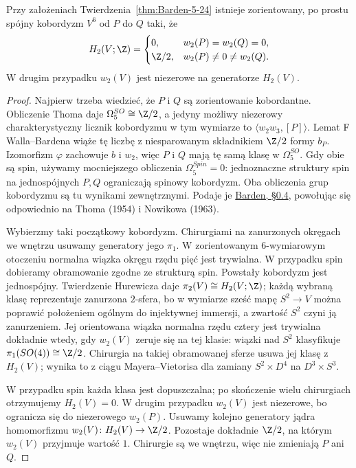 \begin{lemat}
\label{lem:barden-start-24}
Przy założeniach Twierdzenia~\ref{thm:Barden-5-24}
istnieje zorientowany, po prostu spójny
kobordyzm $V^6$ od $P$ do $Q$ taki, że
\[
 H_2(V;\Z)=
 \begin{cases}
 0,&w_2(P)=w_2(Q)=0,\\
 \Z/2,&w_2(P)\ne0\ne w_2(Q).
 \end{cases}
\]
W drugim przypadku $w_2(V)$ jest
niezerowe na generatorze $H_2(V)$.
\end{lemat}
\begin{proof}
Najpierw trzeba wiedzieć, że $P$ i $Q$
są zorientowanie kobordantne.
Obliczenie Thoma daje
$\Omega^{SO}_5\cong\Z/2$, a jedyny
możliwy niezerowy charakterystyczny
licznik kobordyzmu w tym wymiarze to
$\langle w_2w_3,[P]\rangle$.
Lemat F Walla--Bardena wiąże tę liczbę
z niesparowanym składnikiem $\Z/2$
formy $b_P$. Izomorfizm $\varphi$
zachowuje $b$ i $w_2$, więc $P$ i $Q$
mają tę samą klasę w $\Omega^{SO}_5$.
Gdy obie są spin, używamy mocniejszego
obliczenia $\Omega^{Spin}_5=0$:
jednoznaczne struktury spin na jednospójnych
$P,Q$ ograniczają spinowy kobordyzm.
Oba obliczenia grup kobordyzmu są tu
wynikami zewnętrznymi. Podaje je
\href{https://www.sas.rochester.edu/mth/sites/doug-ravenel/otherpapers/barden.pdf}
{Barden, §0.4}, powołując się
odpowiednio na Thoma (1954) i
Nowikowa (1963).

Wybierzmy taki początkowy kobordyzm.
Chirurgiami na zanurzonych okręgach we
wnętrzu usuwamy generatory jego $\pi_1$.
W zorientowanym $6$-wymiarowym otoczeniu
normalna wiązka okręgu rzędu pięć jest
trywialna. W przypadku spin dobieramy
obramowanie zgodne ze strukturą spin.
Powstały kobordyzm jest jednospójny.
Twierdzenie Hurewicza daje
$\pi_2(V)\cong H_2(V;\Z)$; każdą
wybraną klasę reprezentuje zanurzona
$2$-sfera, bo w wymiarze sześć mapę
$S^2\to V$ można poprawić położeniem
ogólnym do injektywnej immersji,
a zwartość $S^2$ czyni ją zanurzeniem.
Jej orientowana
wiązka normalna rzędu cztery jest
trywialna dokładnie wtedy, gdy
$w_2(V)$ zeruje się na tej klasie:
wiązki nad $S^2$ klasyfikuje
$\pi_1(SO(4))\cong\Z/2$.
Chirurgia na takiej obramowanej sferze
usuwa jej klasę z $H_2(V)$; wynika to
z ciągu Mayera--Vietorisa dla zamiany
$S^2\times D^4$ na $D^3\times S^3$.

W przypadku spin każda klasa jest
dopuszczalna; po skończenie wielu
chirurgiach otrzymujemy $H_2(V)=0$.
W drugim przypadku $w_2(V)$ jest
niezerowe, bo ogranicza się do
niezerowego $w_2(P)$. Usuwamy kolejno
generatory jądra homomorfizmu
$w_2(V)\colon H_2(V)\to\Z/2$.
Pozostaje dokładnie $\Z/2$, na którym
$w_2(V)$ przyjmuje wartość $1$.
Chirurgie są we wnętrzu, więc nie
zmieniają $P$ ani $Q$.
\end{proof}

